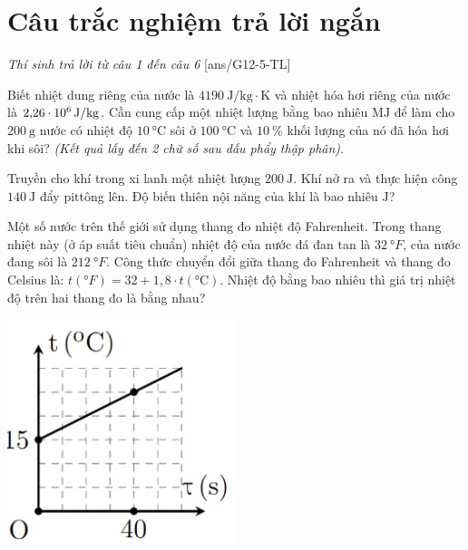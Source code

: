 \section{Câu trắc nghiệm trả lời ngắn} \textit{Thí sinh trả lời từ câu 1 đến câu 6}
\setcounter{ex}{0}
[ans/G12-5-TL]
\begin{ex}
	Biết nhiệt dung riêng của nước là $\SI{4190}{\joule/\kilogram\cdot\kelvin}$ và nhiệt hóa hơi riêng của nước là $\SI{2.26E6}{\joule/\kilogram}$. Cần cung cấp một nhiệt lượng bằng bao nhiêu $\si{\mega\joule}$ để làm cho $\SI{200}{\gram}$ nước có nhiệt độ $\SI{10}{\celsius}$ sôi ở $\SI{100}{\celsius}$ và $\SI{10}{\percent}$ khối lượng của nó đã hóa hơi khi sôi? \textit{(Kết quả lấy đến 2 chữ số sau dấu phẩy thập phân)}.
	\shortans{ }
\end{ex}
\begin{ex}
Truyền cho khí trong xi lanh một nhiệt lượng $\SI{200}{\joule}$. Khí nở ra và thực hiện công $\SI{140}{\joule}$ đẩy pittông lên. Độ biến thiên nội năng của khí là bao nhiêu $\si{\joule}$?
\end{ex}
\begin{ex}
	Một số nước trên thế giới sử dụng thang đo nhiệt độ Fahrenheit. Trong thang nhiệt này (ở áp suất tiêu chuẩn) nhiệt độ của nước đá đan tan là $\SI{32}{\degree F}$, của nước đang sôi là $\SI{212}{\degree F}$. Công thức chuyển đổi giữa thang đo Fahrenheit và thang đo Celsius là: $t\left(\si{\degree F}\right)=32+1,8 \cdot t\left(\si{\celsius}\right)$. Nhiệt độ bằng bao nhiêu thì giá trị nhiệt độ trên hai thang đo là bằng nhau?
	\end{ex}
	\begin{ex}
	{
	\includegraphics[width=0.4\linewidth]{../figs/D12-5-4}
	}
	\end{ex}
